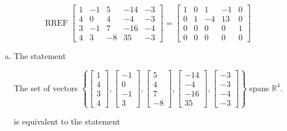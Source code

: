\begin{exerciseAnswer} 


\[\operatorname{RREF} \left[\begin{array}{ccccc}
1 & -1 & 5 & -14 & -3 \\
4 & 0 & 4 & -4 & -3 \\
3 & -1 & 7 & -16 & -4 \\
4 & 3 & -8 & 35 & -3
\end{array}\right] = \left[\begin{array}{ccccc}
1 & 0 & 1 & -1 & 0 \\
0 & 1 & -4 & 13 & 0 \\
0 & 0 & 0 & 0 & 1 \\
0 & 0 & 0 & 0 & 0
\end{array}\right] \]


\begin{enumerate}[(a)]
\item The statement 
\begin{center}\begin{minipage}{0.8\textwidth}
 The set of vectors \( \left\{ \left[\begin{array}{c}
1 \\
4 \\
3 \\
4
\end{array}\right] , \left[\begin{array}{c}
-1 \\
0 \\
-1 \\
3
\end{array}\right] , \left[\begin{array}{c}
5 \\
4 \\
7 \\
-8
\end{array}\right] , \left[\begin{array}{c}
-14 \\
-4 \\
-16 \\
35
\end{array}\right] , \left[\begin{array}{c}
-3 \\
-3 \\
-4 \\
-3
\end{array}\right] \right\} \) spans \(\mathbb{R}^4\). 
\end{minipage}\end{center}
     is equivalent to the statement 

\end{enumerate}
\end{exerciseAnswer}
